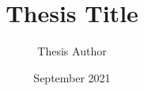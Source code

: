 \documentclass[12pt, eng, phd]{thesis}
\title{Thesis Title}{제목}
\author{Thesis Author}{작가}
\date{September 2021}{2025년 9월}
\begin{document}
\makecover
\setbodylayout
\frontmatter

\tableofcontents \clearpage
\listoffigures \clearpage
\listoftables \clearpage

\mainmatter



\backmatter
\makebibliography
\makeabstract
\end{document}
